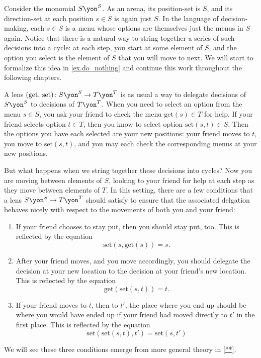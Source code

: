 \documentclass[Book-Poly]{subfiles}
\begin{document}
\begin{example}
Consider the monomial $S\yon^S$. As an arena, its position-set is $S$, and its direction-set at each position $s\in S$ is again just $S$.
In the language of decision-making, each $s \in S$ is a menu whose options are themselves just the menus in $S$ again.
Notice that there is a natural way to string together a series of such decisions into a cycle: at each step, you start at some element of $S$, and the option you select is the element of $S$ that you will move to next.
We will start to formalize this idea in \cref{ex.do_nothing} and continue this work throughout the following chapters.

A lens $(\text{get, set})\colon S\yon^S\to T\yon^T$ is as usual a way to delegate decisions of $S\yon^S$ to decisions of $T\yon^T$.
When you need to select an option from the menu $s \in S$, you ask your friend to check the menu $\text{get}(s) \in T$ for help.
If your friend selects option $t \in T$, then you know to select option $\text{set}(s, t) \in S$.
Then the options you have each selected are your new positions: your friend moves to $t$, you move to $\text{set}(s, t)$, and you may each check the corresponding menus at your new positions.

But what happens when we string together these decisions into cycles?
Now you are moving between elements of $S$, looking to your friend for help at each step as they move between elements of $T$.
In this setting, there are a few conditions that a lens $S\yon^S \to T\yon^T$ should satisfy to ensure that the associated delgation behaves nicely with respect to the movements of both you and your friend:
\begin{enumerate}
    \item If your friend chooses to stay put, then you should stay put, too.
    This is reflected by the equation
    \[
        \text{set}(s,\text{get}(s))=s.
    \]
    
    \item After your friend moves, and you move accordingly, you should delegate the decision at your new location to the decision at your friend's new location.
    This is reflected by the equation
    \[
        \text{get}(\text{set}(s,t))=t.
    \]

    \item If your friend moves to $t$, then to $t'$, the place where you end up should be where you would have ended up if your friend had moved directly to $t'$ in the first place.
    This is reflected by the equation
    \[
        \text{set}(\text{set}(s,t),t')=\text{set}(s,t')
    \]
\end{enumerate}
We will see these three conditions emerge from more general theory in \cref{**}.
\end{example}
\end{document}

